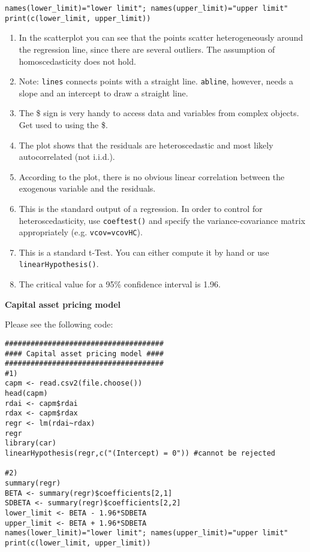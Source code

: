 \begin{Solution}{7.1}
\begin{verbatim}
names(lower_limit)="lower limit"; names(upper_limit)="upper limit"
print(c(lower_limit, upper_limit))
\end{verbatim}
\begin{enumerate}
  \item In the scatterplot you can see that the points scatter
      heterogeneously around the regression line, since there are several
      outliers. The assumption of homoscedasticity does not hold.
  \item Note: \texttt{lines} connects points with a straight line.
      \texttt{abline}, however, needs a slope and an intercept to draw a
      straight line.
  \item The \$ sign is very handy to access data and variables from
      complex objects. Get used to using the \$.
  \item The plot shows that the residuals are heteroscedastic and
      most likely autocorrelated (not i.i.d.).
  \item According to the plot, there is no obvious linear correlation
      between the exogenous variable and the residuals.
  \item This is the standard output of a regression. In order to control
      for heteroscedasticity, use \texttt{coeftest()} and specify the
      variance-covariance matrix appropriately (e.g.
      \texttt{vcov=vcovHC}).
  \item This is a standard t-Test. You can either compute it by hand or
      use \texttt{linearHypothesis()}.
  \item The critical value for a 95\% confidence interval is 1.96.
\end{enumerate}
\end{Solution}
\begin{Solution}{7.2}
\textbf{Capital asset pricing model}

Please see the following code:
\begin{verbatim}
#####################################
#### Capital asset pricing model ####
#####################################
#1)
capm <- read.csv2(file.choose())
head(capm)
rdai <- capm$rdai
rdax <- capm$rdax
regr <- lm(rdai~rdax)
regr
library(car)
linearHypothesis(regr,c("(Intercept) = 0")) #cannot be rejected

#2)
summary(regr)
BETA <- summary(regr)$coefficients[2,1]
SDBETA <- summary(regr)$coefficients[2,2]
lower_limit <- BETA - 1.96*SDBETA
upper_limit <- BETA + 1.96*SDBETA
names(lower_limit)="lower limit"; names(upper_limit)="upper limit"
print(c(lower_limit, upper_limit))
\end{verbatim}
\end{Solution}
